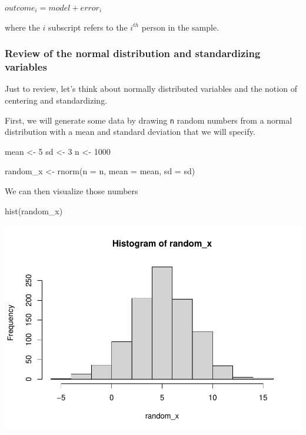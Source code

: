 \documentclass[
]{book}
\newenvironment{Shaded}{\begin{snugshade}}{\end{snugshade}}
\newcommand{\AttributeTok}[1]{\textcolor[rgb]{0.77,0.63,0.00}{#1}}
\newcommand{\DecValTok}[1]{\textcolor[rgb]{0.00,0.00,0.81}{#1}}
\newcommand{\FunctionTok}[1]{\textcolor[rgb]{0.00,0.00,0.00}{#1}}
\newcommand{\NormalTok}[1]{#1}
\newcommand{\OtherTok}[1]{\textcolor[rgb]{0.56,0.35,0.01}{#1}}
\begin{document}
\(outcome_i = model + error_i\)

where the \(i\) subscript refers to the \(i^{th}\) person in the sample.

\hypertarget{review-of-the-normal-distribution-and-standardizing-variables}{%
\subsubsection{Review of the normal distribution and standardizing variables}\label{review-of-the-normal-distribution-and-standardizing-variables}}

Just to review, let's think about normally distributed variables and the notion of centering and standardizing.

First, we will generate some data by drawing \texttt{n} random numbers from a normal distribution with a mean and standard deviation that we will specify.

\begin{Shaded}
\begin{Highlighting}[]
\NormalTok{mean }\OtherTok{\textless{}{-}} \DecValTok{5}
\NormalTok{sd }\OtherTok{\textless{}{-}} \DecValTok{3}
\NormalTok{n }\OtherTok{\textless{}{-}} \DecValTok{1000}

\NormalTok{random\_x }\OtherTok{\textless{}{-}} \FunctionTok{rnorm}\NormalTok{(}\AttributeTok{n =}\NormalTok{ n, }\AttributeTok{mean =}\NormalTok{ mean, }\AttributeTok{sd =}\NormalTok{ sd)}
\end{Highlighting}
\end{Shaded}

We can then visualize those numbers

\begin{Shaded}
\begin{Highlighting}[]
\FunctionTok{hist}\NormalTok{(random\_x)}
\end{Highlighting}
\end{Shaded}

\includegraphics{test_course_notes_files/figure-latex/unnamed-chunk-74-1.pdf}
\end{document}
